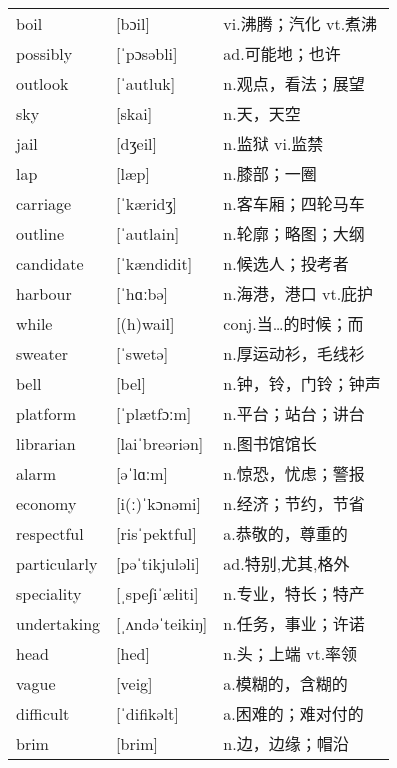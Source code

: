 \documentclass[a4paper]{article}
\begin{document}
\section{}
\begin{tabular}{l l l}

boil & [bɔil] & vi.沸腾；汽化 vt.煮沸 \\
possibly & [ˈpɔsəbli] & ad.可能地；也许 \\
outlook & [ˈautluk] & n.观点，看法；展望 \\
sky & [skai] & n.天，天空 \\
jail & [dʒeil] & n.监狱 vi.监禁 \\
lap & [læp] & n.膝部；一圈 \\
carriage & [ˈkæridʒ] & n.客车厢；四轮马车 \\
outline & [ˈautlain] & n.轮廓；略图；大纲 \\
candidate & [ˈkændidit] & n.候选人；投考者 \\
harbour & [ˈhɑːbə] & n.海港，港口 vt.庇护 \\
while & [(h)wail] & conj.当…的时候；而 \\
sweater & [ˈswetə] & n.厚运动衫，毛线衫 \\
bell & [bel] & n.钟，铃，门铃；钟声 \\
platform & [ˈplætfɔːm] & n.平台；站台；讲台 \\
librarian & [laiˈbreəriən] & n.图书馆馆长 \\
alarm & [əˈlɑːm] & n.惊恐，忧虑；警报 \\
economy & [i(ː)ˈkɔnəmi] & n.经济；节约，节省 \\
respectful & [risˈpektful] & a.恭敬的，尊重的 \\
particularly & [pəˈtikjuləli] & ad.特别,尤其,格外 \\
speciality & [ˌspe∫iˈæliti] & n.专业，特长；特产 \\
undertaking & [ˌʌndəˈteikiŋ] & n.任务，事业；许诺 \\
head & [hed] & n.头；上端 vt.率领 \\
vague & [veig] & a.模糊的，含糊的 \\
difficult & [ˈdifikəlt] & a.困难的；难对付的 \\
brim & [brim] & n.边，边缘；帽沿 \\

\end{tabular}
\end{document}

